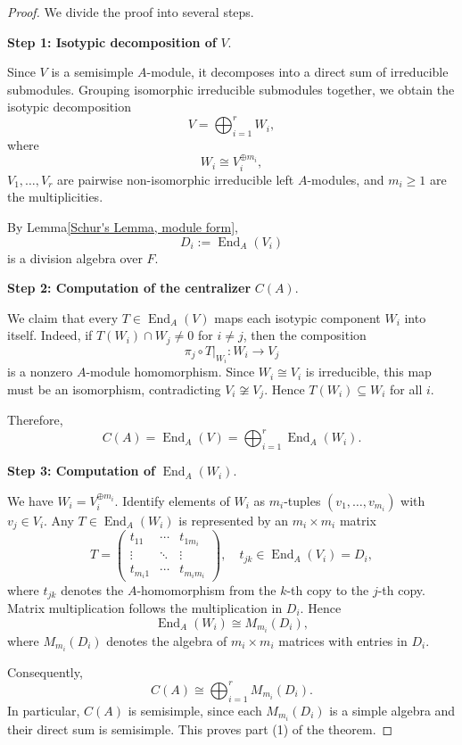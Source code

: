 \begin{proof}
We divide the proof into several steps.

\medskip
\noindent\textbf{Step 1: Isotypic decomposition of }$V$.

Since $V$ is a semisimple $A$-module, it decomposes into a direct sum of irreducible submodules. Grouping isomorphic irreducible submodules together, we obtain the isotypic decomposition
\[
V=\bigoplus_{i=1}^{r} W_i,
\]
where
\[
W_i \cong V_i^{\oplus m_i},
\]
$V_1,\dots,V_r$ are pairwise non-isomorphic irreducible left $A$-modules, and $m_i\ge 1$ are the multiplicities.

By Lemma\ref{Schur's Lemma, module form},
\[
D_i:=\operatorname{End}_A(V_i)
\]
is a division algebra over $F$.

\medskip
\noindent\textbf{Step 2: Computation of the centralizer }$C(A)$.

We claim that every $T\in \operatorname{End}_A(V)$ maps each isotypic component $W_i$ into itself. Indeed, if $T(W_i)\cap W_j \neq 0$ for $i\neq j$, then the composition
\[
\pi_j \circ T|_{W_i}: W_i \longrightarrow V_j
\]
is a nonzero $A$-module homomorphism. Since $W_i\cong V_i$ is irreducible, this map must be an isomorphism, contradicting $V_i\not\cong V_j$. Hence $T(W_i)\subseteq W_i$ for all $i$.

Therefore,
\[
C(A)=\operatorname{End}_A(V)=\bigoplus_{i=1}^{r}\operatorname{End}_A(W_i).
\]

\medskip
\noindent\textbf{Step 3: Computation of }$\operatorname{End}_A(W_i)$.

We have $W_i=V_i^{\oplus m_i}$. Identify elements of $W_i$ as $m_i$-tuples $(v_1,\dots,v_{m_i})$ with $v_j\in V_i$. Any $T\in \operatorname{End}_A(W_i)$ is represented by an $m_i\times m_i$ matrix
\[
T =
\begin{pmatrix}
t_{11} & \cdots & t_{1m_i}\\
\vdots & \ddots & \vdots\\
t_{m_i1} & \cdots & t_{m_i m_i}
\end{pmatrix},
\quad t_{jk}\in \operatorname{End}_A(V_i)=D_i,
\]
where $t_{jk}$ denotes the $A$-homomorphism from the $k$-th copy to the $j$-th copy. Matrix multiplication follows the multiplication in $D_i$. Hence
\[
\operatorname{End}_A(W_i) \cong M_{m_i}(D_i),
\]
where $M_{m_i}(D_i)$ denotes the algebra of $m_i\times m_i$ matrices with entries in $D_i$.

Consequently,
\[
C(A) \cong \bigoplus_{i=1}^{r} M_{m_i}(D_i).
\]
In particular, $C(A)$ is semisimple, since each $M_{m_i}(D_i)$ is a simple algebra and their direct sum is semisimple. This proves part (1) of the theorem.


\end{proof}
